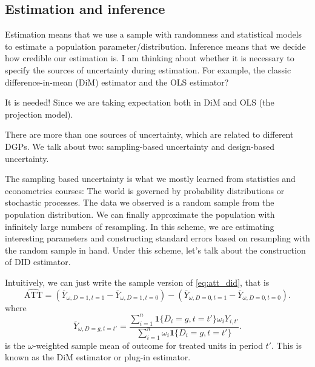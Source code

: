 \documentclass[12pt]{article}
\begin{document}
\subsection{Estimation and inference}

Estimation means that we use a sample with randomness and statistical models to estimate a
population parameter/distribution. Inference means that we decide how credible our estimation is.
I am thinking about whether it is necessary to specify the sources of uncertainty during estimation.
For example, the classic difference-in-mean (DiM) estimator and the OLS estimator?

It is needed! Since we are taking expectation both in DiM and OLS (the projection model).

There are more than one sources of uncertainty, which are related to different DGPs. We
talk about two:
sampling-based uncertainty and design-based uncertainty.

The sampling based uncertainty is what we mostly learned from statistics and econometrics courses:
The world is governed by probability distributions or stochastic processes. The data we observed
is a random sample from the population distribution. We can finally approximate the population
with infinitely large numbers of resampling. In this scheme, we are estimating
interesting parameters
and constructing standard errors based on resampling with the random sample in hand.
Under this scheme,
let's talk about the construction of DID estimator.

Intuitively, we can just write the sample version of \autoref{eq:att_did}, that is
\[
  \widehat{\text{ATT}} = \left( \overline{Y}_{\omega , D=1,t=1}-\overline{Y}_{\omega
  ,D=1,t=0} \right) - \left( \overline{Y}_{\omega , D=0,t=1}-\overline{Y}_{\omega
  ,D=0,t=0} \right)
.\]
where
\[
  \overline{Y}_{\omega ,D=g,t=t'} = \frac{\sum_{i=1}^{n} \mathbf{1}\{D_i=g,t=t'\}
  \omega_i Y_{i,t'} }{\sum_{i=1}^{n}\omega_i \mathbf{1}\{D_i=g,t=t'\}  }
.\]
is the \( \omega \)-weighted sample mean of outcome for treated units in period \( t' \).
This is known
as the DiM estimator or plug-in estimator.
\end{document}
